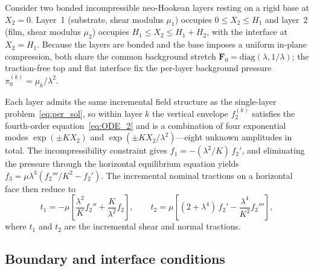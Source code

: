 \documentclass[final,3p,times]{elsarticle}
\begin{document}
Consider two bonded incompressible neo-Hookean layers resting on a rigid
base at $X_2=0$. Layer~1 (substrate, shear modulus $\mu_1$) occupies
$0\leqslant X_2\leqslant H_1$ and layer~2 (film, shear modulus $\mu_2$)
occupies $H_1\leqslant X_2\leqslant H_1+H_2$, with the interface at
$X_2=H_1$. Because the layers are bonded and the base imposes a uniform
in-plane compression, both share the common background stretch
$\mathbf{F}_0=\mathrm{diag}(\lambda,1/\lambda)$; the traction-free top and
flat interface fix the per-layer background pressure
$\pi_0^{(k)}=\mu_k/\lambda^2$.

Each layer admits the same incremental field structure as the
single-layer problem~\eqref{eq:per_sol}, so within layer $k$ the vertical
envelope $f_2^{(k)}$ satisfies the fourth-order equation~\eqref{eq:ODE_2}
and is a combination of four exponential modes
$\exp(\pm K X_2)$ and $\exp(\pm K X_2/\lambda^2)$---eight unknown
amplitudes in total. The incompressibility constraint gives
$f_1=-(\lambda^2/K)\,f_2'$, and eliminating the pressure through the
horizontal equilibrium equation yields
$f_3=\mu\lambda^3\!\left(f_2'''/K^2-f_2'\right)$. The incremental nominal
tractions on a horizontal face then reduce to
\begin{equation}
  t_1 = -\mu\!\left[\frac{\lambda^2}{K}f_2'' + \frac{K}{\lambda^2}f_2\right],
  \qquad
  t_2 = \mu\!\left[(2+\lambda^4)\,f_2' - \frac{\lambda^4}{K^2}f_2'''\right],
  \label{eq:bilayer_tractions}
\end{equation}
where $t_1$ and $t_2$ are the incremental shear and normal tractions.

\subsection{Boundary and interface conditions}
\end{document}
